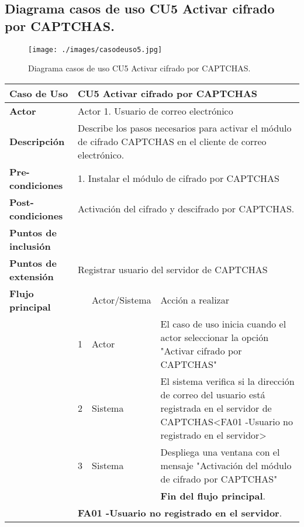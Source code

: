 \documentclass[12pt,oneside,onecolumn,openany]{report}
\begin{document}
\subsection{Diagrama casos de uso CU5 Activar cifrado por CAPTCHAS.}
\begin{figure}[H]
	\texttt{[image: ./images/casodeuso5.jpg]}
	\caption{Diagrama casos de uso CU5 Activar cifrado por CAPTCHAS.}
	\label{fig:4-6-1}
\end{figure}
\begin{longtable}[H]{| p{} | p{} |p{4cm}|p{5cm}|}
     \hline
     \textbf{Caso de Uso} &\multicolumn{3}{|l|}{CU5 Activar cifrado por CAPTCHAS}\\
     \hline
     \textbf{Actor} & \multicolumn{3}{|l|}{Actor 1. Usuario de correo electrónico}\\
     \hline
     \textbf{Descripción} & \multicolumn{3}{|p{10cm}|}{Describe los pasos necesarios para activar el módulo de cifrado CAPTCHAS en el cliente de correo electrónico.}\\
     \hline
     \textbf{Pre-condiciones} & \multicolumn{3}{|l|}{1. Instalar el módulo de cifrado por CAPTCHAS}\\
     \hline
     \textbf{Post-condiciones} & \multicolumn{3}{|l|}{Activación del cifrado y descifrado por CAPTCHAS.}\\
     \hline
     \textbf{Puntos de inclusión} & \multicolumn{3}{|l|}{}\\
     \hline
     \textbf{Puntos de extensión} & \multicolumn{3}{|l|}{Registrar usuario del servidor de CAPTCHAS}\\
     \hline
     \textbf{Flujo principal} & & Actor/Sistema & Acción a realizar\\
     \hline
     & 1 & Actor & El caso de uso inicia cuando el actor seleccionar la opción "Activar cifrado por CAPTCHAS"\\
     \hline
     & 2 & Sistema & El sistema verifica si la dirección de correo del usuario está registrada en el servidor de CAPTCHAS<FA01 -Usuario no registrado en el servidor>\\
     \hline
     & 3 & Sistema & Despliega una ventana con el mensaje "Activación del módulo de cifrado por CAPTCHAS"\\
     \hline
     & & & \textbf{Fin del flujo principal}.\\
     \hline
     & \multicolumn{3}{|l|}{\textbf{FA01 -Usuario no registrado en el servidor}.}\\

\end{longtable}
\end{document}

